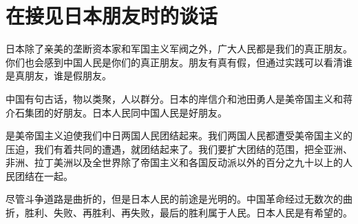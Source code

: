 \section[在接见日本朋友时的谈话（一九六一年十月七日）]{在接见日本朋友时的谈话}

日本除了亲美的垄断资本家和军国主义军阀之外，广大人民都是我们的真正朋友。你们也会感到中国人民是你们的真正朋友。朋友有真有假，但通过实践可以看清谁是真朋友，谁是假朋友。

中国有句古话，物以类聚，人以群分。日本的岸信介和池田勇人是美帝国主义和蒋介石集团的好朋友。日本人民同中国人民是好朋友。

是美帝国主义迫使我们中日两国人民团结起来。我们两国人民都遭受美帝国主义的压迫，我们有着共同的遭遇，就团结起来了。我们要扩大团结的范围，把全亚洲、非洲、拉丁美洲以及全世界除了帝国主义和各国反动派以外的百分之九十以上的人民团结在一起。

尽管斗争道路是曲折的，但是日本人民的前途是光明的。中国革命经过无数次的曲折，胜利、失败、再胜利、再失败，最后的胜利属于人民。日本人民是有希望的。


